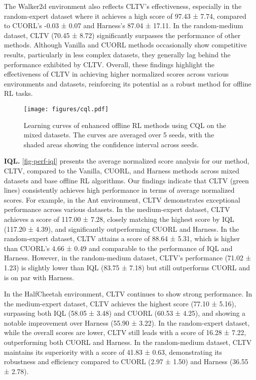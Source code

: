 The Walker2d environment also reflects CLTV’s effectiveness, especially in the random-expert dataset where it achieves a high score of 97.43 ± 7.74, compared to CUORL’s -0.03 ± 0.07 and Harness’s 87.04 ± 17.11. In the random-medium dataset, CLTV (70.45 ± 8.72) significantly surpasses the performance of other methods. Although Vanilla and CUORL methods occasionally show competitive results, particularly in less complex datasets, they generally lag behind the performance exhibited by CLTV. Overall, these findings highlight the effectiveness of CLTV in achieving higher normalized scores across various environments and datasets, reinforcing its potential as a robust method for offline RL tasks. 



\begin{figure}[!ht]
\center
\texttt{[image: figures/cql.pdf]}
\caption{Learning curves of enhanced offline RL methods using CQL on the mixed datasets. The curves are averaged over 5 seeds, with the shaded areas showing the confidence interval across seeds.}
\label{fig-perf-cql}
\end{figure}



\textbf{IQL.} \autoref{fig-perf-iql} presents the average normalized score analysis for our method, CLTV, compared to the Vanilla, CUORL, and Harness methods across mixed datasets and base offline RL algorithms. Our findings indicate that CLTV (green lines) consistently achieves high performance in terms of average normalized scores. For example, in the Ant environment, CLTV demonstrates exceptional performance across various datasets. In the medium-expert dataset, CLTV achieves a score of 117.00 ± 7.28, closely matching the highest score by IQL (117.20 ± 4.39), and significantly outperforming CUORL and Harness. In the random-expert dataset, CLTV attains a score of 88.64 ± 5.31, which is higher than CUORL’s 4.66 ± 0.49 and comparable to the performance of IQL and Harness. However, in the random-medium dataset, CLTV's performance (71.02 ± 1.23) is slightly lower than IQL (83.75 ± 7.18) but still outperforms CUORL and is on par with Harness.

In the HalfCheetah environment, CLTV continues to show strong performance. In the medium-expert dataset, CLTV achieves the highest score (77.10 ± 5.16), surpassing both IQL (58.05 ± 3.48) and CUORL (60.53 ± 4.25), and showing a notable improvement over Harness (55.90 ± 3.22). In the random-expert dataset, while the overall scores are lower, CLTV still leads with a score of 16.28 ± 7.22, outperforming both CUORL and Harness. In the random-medium dataset, CLTV maintains its superiority with a score of 41.83 ± 0.63, demonstrating its robustness and efficiency compared to CUORL (2.97 ± 1.50) and Harness (36.55 ± 2.78).

